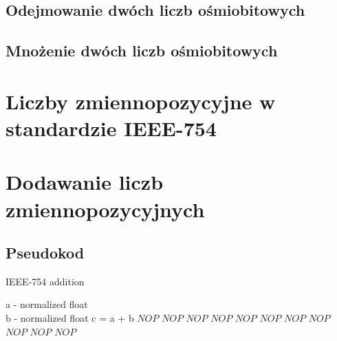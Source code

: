\documentclass[11pt]{aghdpl}
\begin{document}
\subsection{Odejmowanie dwóch liczb ośmiobitowych}

\subsection{Mnożenie dwóch liczb ośmiobitowych}

\section{Liczby zmiennopozycyjne w standardzie IEEE-754}

\section{Dodawanie liczb zmiennopozycyjnych}
\subsection{Pseudokod}
\begin{algorithm}

\caption{IEEE-754 addition}

\begin{algorithmic}[1]
\Require a - normalized float \\
		 b - normalized float
\Ensure c = a + b
\State $NOP$
\State $NOP$
\State $NOP$
\State $NOP$
\State $NOP$
\State $NOP$
\State $NOP$
\State $NOP$
\State $NOP$
\State $NOP$
\State $NOP$
\end{algorithmic}
\end{algorithm}
\end{document}
